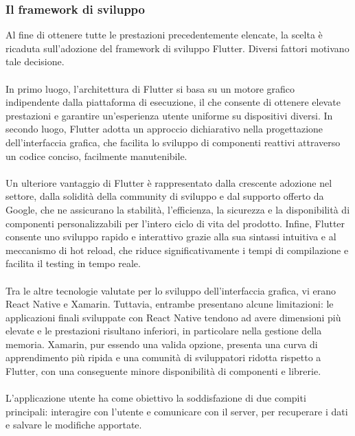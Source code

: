 \subsubsection{Il framework di sviluppo}
Al fine di ottenere tutte le prestazioni precedentemente elencate, 
la scelta è ricaduta sull’adozione del framework di sviluppo Flutter.
Diversi fattori motivano tale decisione. \\
\\
In primo luogo, l'architettura di Flutter si basa su un motore grafico indipendente dalla piattaforma di esecuzione,
il che consente di ottenere elevate prestazioni e 
garantire un'esperienza utente uniforme su dispositivi diversi.
In secondo luogo, Flutter adotta un approccio dichiarativo nella progettazione dell'interfaccia grafica,
che facilita lo sviluppo di componenti reattivi attraverso un codice conciso, facilmente manutenibile.\\
\\
Un ulteriore vantaggio di Flutter è rappresentato dalla crescente adozione nel settore,
dalla solidità della community di sviluppo e dal supporto offerto da Google,
che ne assicurano la stabilità, l'efficienza, la sicurezza e la disponibilità 
di componenti personalizzabili per l'intero ciclo di vita del prodotto.
Infine, Flutter consente uno sviluppo rapido e interattivo grazie alla sua sintassi intuitiva e al meccanismo di hot reload,
che riduce significativamente i tempi di compilazione e facilita il testing in tempo reale.\\
\\
Tra le altre tecnologie valutate per lo sviluppo dell'interfaccia grafica, vi erano React Native e Xamarin.
Tuttavia, entrambe presentano alcune limitazioni: 
le applicazioni finali sviluppate con React Native tendono ad avere dimensioni più elevate e le prestazioni risultano inferiori,
in particolare nella gestione della memoria.
Xamarin, pur essendo una valida opzione, presenta una curva di apprendimento più ripida e 
una comunità di sviluppatori ridotta rispetto a Flutter,
con una conseguente minore disponibilità di componenti e librerie.\\
\\
L'applicazione utente ha come obiettivo la soddisfazione di due compiti principali: interagire con l'utente e 
comunicare con il server, per recuperare i dati e salvare le modifiche apportate.

\clearpage


